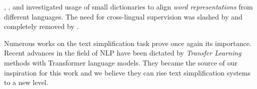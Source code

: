 \cite{Mikolov2013ExploitingSA}, \cite{Faruqui2014ImprovingVS}, \cite{Xing2015NormalizedWE} and \cite{Ammar2016MassivelyMW} investigated usage of small dictionaries to align \emph{word representations} from different languages. The need for cross-lingual supervision was slashed by \cite{DBLP:journals/corr/SmithTHH17} and completely removed by \cite{conneau2017word}.

\bigskip
Numerous works on the text simplification task prove once again its importance. Recent advances in the field of NLP have been dictated by \textit{Transfer Learning} methods with Transformer language models. They became the source of our inspiration for this work and we believe they can rise text simplification systems to a new level.

\endinput